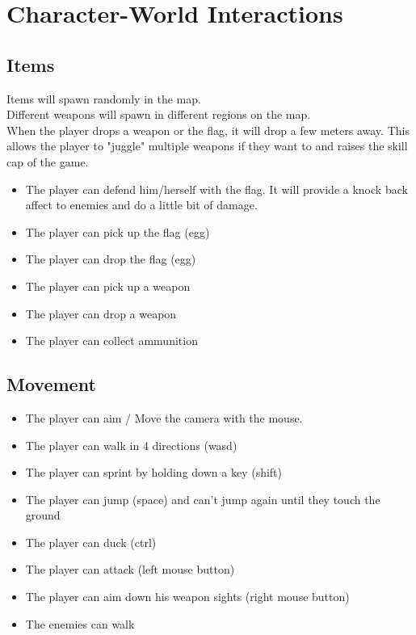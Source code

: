 \documentclass{article}
\begin{document}
\section{Character-World Interactions}
\subsection{Items}
Items will spawn randomly in the map.\\
Different weapons will spawn in different regions on the map.\\
When the player drops a weapon or the flag, it will drop a few meters away. This allows the player to "juggle" multiple weapons if they want to and raises the skill cap of the game.
\begin{itemize}
\item The player can defend him/herself with the flag. It will provide a knock back affect to enemies and do a little bit of damage.
\item The player can pick up the flag (egg)
\item The player can drop the flag (egg)
\item The player can pick up a weapon
\item The player can drop a weapon
\item The player can collect ammunition

\end{itemize}
\subsection{Movement}
\begin{itemize}
\item The player can aim / Move the camera with the mouse. 
\item The player can walk in 4 directions (wasd)
\item The player can sprint by holding down a key (shift)
\item The player can jump (space) and can't jump again until they touch the ground
\item The player can duck (ctrl)
\item The player can attack (left mouse button)
\item The player can aim down his weapon sights (right mouse button)
\item The enemies can walk
\end{itemize}
\end{document}
